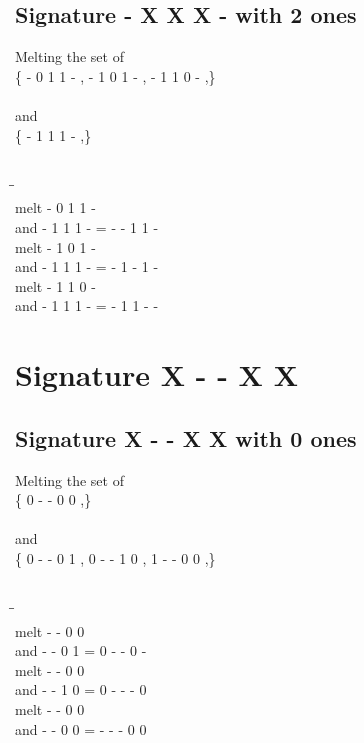\documentclass{article}
\begin{document}
\subsection{Signature - X X X - with 2 ones}
Melting the set of\\
\{ -  0  1  1  - , -  1  0  1  - , -  1  1  0  - ,\}\\\\
and\\
\{ -  1  1  1  - ,\}\\\\
\begin{tabbing}
\hspace{3cm}\=\hspace{3cm}\=\hspace{3cm}\\[1cm]
melt\> -  0  1  1  - \\
and\> -  1  1  1  - \>
 =  -  -  1  1  - \\[1mm]
melt\> -  1  0  1  - \\
and\> -  1  1  1  - \>
 =  -  1  -  1  - \\[1mm]
melt\> -  1  1  0  - \\
and\> -  1  1  1  - \>
 =  -  1  1  -  - \\[1mm]
\end{tabbing}
\newpage
\section{Signature X - - X X }
\subsection{Signature X - - X X with 0 ones}
Melting the set of\\
\{ 0  -  -  0  0 ,\}\\\\
and\\
\{ 0  -  -  0  1 , 0  -  -  1  0 , 1  -  -  0  0 ,\}\\\\
\begin{tabbing}
\hspace{3cm}\=\hspace{3cm}\=\hspace{3cm}\\[1cm]
melt  -  -  0  0 \\
and  -  -  0  1 \>
 =  0  -  -  0  - \\[1mm]
melt  -  -  0  0 \\
and  -  -  1  0 \>
 =  0  -  -  -  0 \\[1mm]
melt  -  -  0  0 \\
and  -  -  0  0 \>
 =  -  -  -  0  0 \\[1mm]
\end{tabbing}
\newpage
\end{document}
